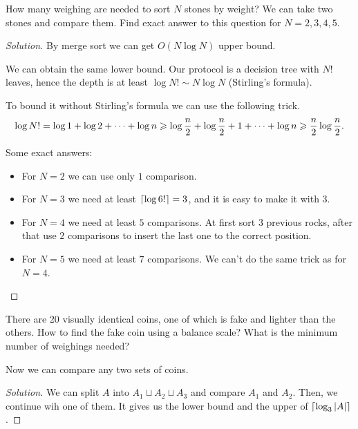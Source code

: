 \begin{example}
    How many weighing are needed to sort $N$ stones by weight?
    We can take two stones and compare them.
    Find exact answer to this question for $N = 2, 3, 4, 5$.
\end{example}
\begin{proof}[Solution]
    By merge sort we can get $O(N \log N)$ upper bound.

    We can obtain the same lower bound.
    Our protocol is a decision tree with $N!$ leaves, hence the depth is at least $\log N! \sim N \log N$ (Stirling's formula).

    To bound it without Stirling's formula we can use the following trick.
    \[
        \log N! = \log 1 + \log 2 + \dots + \log n \geq \log \frac n 2 + \log \frac n 2 + 1 + \dots + \log n \geq \frac n 2 \log \frac n 2. \qedhere
    \]

    Some exact answers:
    \begin{itemize}
        \item For $N = 2$ we can use only $1$ comparison.
        \item For $N = 3$ we need at least $\ceil{\log 6!} = 3$, and it is easy to make it with $3$.
        \item For $N = 4$ we need at least $5$ comparisons.
        At first sort $3$ previous rocks, after that use $2$ comparisons to insert the last one to the correct position.
        \item For $N = 5$ we need at least $7$ comparisons.
        We can't do the same trick as for $N = 4$.
        \hw
    \end{itemize}

\end{proof}

\begin{example}
    There are 20 visually identical coins, one of which is fake and lighter than the others.
    How to find the fake coin using a balance scale?
    What is the minimum number of weighings needed?

    Now we can compare any two sets of coins.
\end{example}
\begin{proof}[Solution]
    We can split $A$ into $A_1 \sqcup A_2 \sqcup A_3$ and compare $A_1$ and $A_2$.
    Then, we continue wih one of them.
    It gives us the lower bound and the upper of $\ceil{\log_3 |A|}$.
\end{proof}


